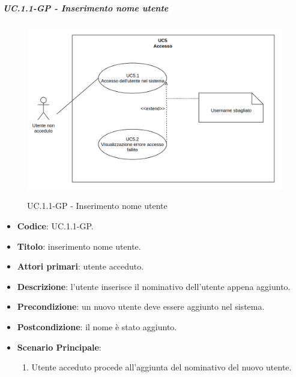 		\subparagraph{UC\theuccount.1.1-GP - Inserimento nome utente}
			\begin{figure}[H]
				\centering
				\includegraphics[width=\columnwidth]{img/UC5.png}\\
				\caption{UC\theuccount.1.1-GP - Inserimento nome utente}
			\end{figure}
			\begin{itemize}
				\item \textbf{Codice}: UC\theuccount.1.1-GP.
				\item \textbf{Titolo}: inserimento nome utente.
				\item \textbf{Attori primari}: utente acceduto.
				\item \textbf{Descrizione}: l'utente inserisce il nominativo dell'utente appena aggiunto.
				\item \textbf{Precondizione}: un nuovo utente deve essere aggiunto nel sistema.
				\item \textbf{Postcondizione}: il nome è stato aggiunto.
				\item \textbf{Scenario Principale}:
				\begin{enumerate}
					\item Utente acceduto procede all'aggiunta del nominativo del nuovo utente.
				\end{enumerate}
			\end{itemize}

